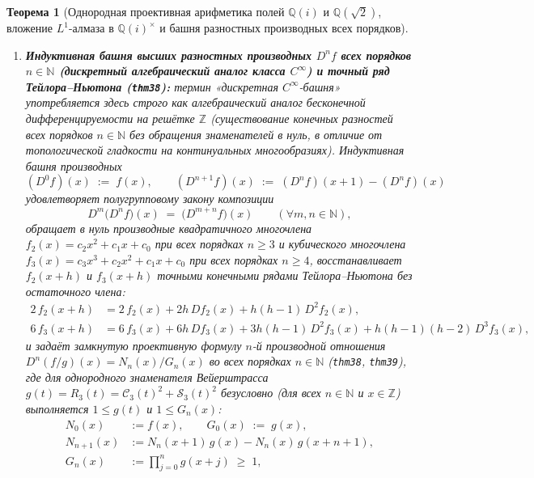 \documentclass[11pt,a4paper]{article}
\theoremstyle{plain}
\newtheorem{theorem}{Теорема}[section]
\theoremstyle{definition}
\begin{document}
\begin{theorem}[Однородная проективная арифметика полей $\mathbb{Q}(i)$ и $\mathbb{Q}(\sqrt{2})$, вложение $L^1$-алмаза в $\mathbb{Q}(i)^\times$ и башня разностных производных всех порядков]
\begin{enumerate}[label=\textbf{(\roman*)},leftmargin=*]
\item \textbf{Индуктивная башня высших разностных производных $D^n f$ всех порядков $n \in \mathbb{N}$ (дискретный алгебраический аналог класса $C^\infty$) и точный ряд Тейлора--Ньютона (\texttt{thm38}):}
  термин «дискретная $C^\infty$-башня» употребляется здесь строго как алгебраический аналог бесконечной дифференцируемости на решётке $\mathbb{Z}$ (существование конечных разностей всех порядков $n \in \mathbb{N}$ без обращения знаменателей в нуль, в отличие от топологической гладкости на континуальных многообразиях). Индуктивная башня производных
  \begin{equation}
    \label{eq:field-deriv-n-def}
    (D^0 f)(x) \;:=\; f(x),
    \qquad
    (D^{n+1} f)(x) \;:=\; (D^n f)(x+1) - (D^n f)(x)
  \end{equation}
  удовлетворяет полугрупповому закону композиции
  \begin{equation}
    \label{eq:field-deriv-composition}
    D^m\bigl(D^n f\bigr)(x) \;=\; \bigl(D^{m+n} f\bigr)(x)
    \qquad (\forall m, n \in \mathbb{N}),
  \end{equation}
  обращает в нуль производные квадратичного многочлена $f_2(x) = c_2 x^2 + c_1 x + c_0$ при всех порядках $n \ge 3$ и кубического многочлена $f_3(x) = c_3 x^3 + c_2 x^2 + c_1 x + c_0$ при всех порядках $n \ge 4$, восстанавливает $f_2(x+h)$ и $f_3(x+h)$ точными конечными рядами Тейлора--Ньютона без остаточного члена:
  \begin{align}
    2\,f_2(x+h) &= 2\,f_2(x) + 2h\,Df_2(x) + h(h-1)\,D^2f_2(x), \label{eq:taylor-newton-quad} \\
    6\,f_3(x+h) &= 6\,f_3(x) + 6h\,Df_3(x) + 3h(h-1)\,D^2f_3(x) + h(h-1)(h-2)\,D^3f_3(x), \label{eq:taylor-newton-cubic}
  \end{align}
  и задаёт замкнутую проективную формулу $n$-й производной отношения $D^n(f/g)(x) = N_n(x) / G_n(x)$ во всех порядках $n \in \mathbb{N}$ (\texttt{thm38}, \texttt{thm39}), где для однородного знаменателя Вейерштрасса $g(t) = R_3(t) = \mathcal{C}_3(t)^2 + \mathcal{S}_3(t)^2$ безусловно (для всех $n \in \mathbb{N}$ и $x \in \mathbb{Z}$) выполняется $1 \le g(t)$ и $1 \le G_n(x)$:
  \begin{align}
    N_0(x) &:= f(x), \qquad G_0(x) \;:=\; g(x), \label{eq:quotient-deriv-n-base} \\
    N_{n+1}(x) &:= N_n(x+1)\,g(x) - N_n(x)\,g(x+n+1), \label{eq:quotient-deriv-n-numer} \\
    G_n(x) &:= \prod_{j=0}^{n} g(x+j) \;\ge\; 1, \label{eq:c-infinity-denom-pos}
  \end{align}

\end{enumerate}
\end{theorem}
\end{document}
